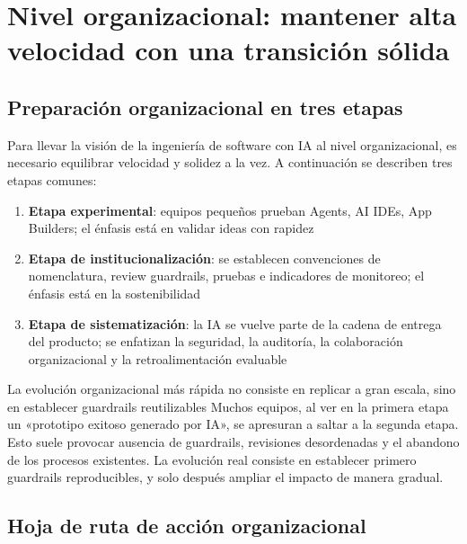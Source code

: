 \section{Nivel organizacional: mantener alta velocidad con una transición sólida}

\subsection{Preparación organizacional en tres etapas}

Para llevar la visión de la ingeniería de software con IA al nivel organizacional, es necesario equilibrar velocidad y solidez a la vez. A continuación se describen tres etapas comunes:

\begin{enumerate}
    \item \textbf{Etapa experimental}: equipos pequeños prueban Agents, AI IDEs, App Builders; el énfasis está en validar ideas con rapidez
    \item \textbf{Etapa de institucionalización}: se establecen convenciones de nomenclatura, review guardrails, pruebas e indicadores de monitoreo; el énfasis está en la sostenibilidad
    \item \textbf{Etapa de sistematización}: la IA se vuelve parte de la cadena de entrega del producto; se enfatizan la seguridad, la auditoría, la colaboración organizacional y la retroalimentación evaluable
\end{enumerate}

\begin{importantbox}{La evolución organizacional más rápida no consiste en replicar a gran escala, sino en establecer guardrails reutilizables}
Muchos equipos, al ver en la primera etapa un «prototipo exitoso generado por IA», se apresuran a saltar a la segunda etapa. Esto suele provocar ausencia de guardrails, revisiones desordenadas y el abandono de los procesos existentes. La evolución real consiste en establecer primero guardrails reproducibles, y solo después ampliar el impacto de manera gradual.
\end{importantbox}

\subsection{Hoja de ruta de acción organizacional}

